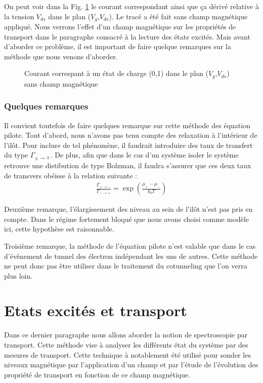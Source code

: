 On peut voir dans la Fig. \ref{SimulatedCoulombMap} le courant correspondant ainsi que ça dérivé relative à la tension $V_{ds}$ dans le plan ($V_g$,$V_{ds}$). Le tracé a été fait sans champ magnétique appliqué. Nous verrons l'effet d'un champ magnétique sur les propriétés de transport dans le paragraphe consacré à la lecture des états excités. Mais avant d'aborder ce problème, il est important de faire quelque remarques sur la méthode que nous venons d'aborder.
\begin{figure}
\caption{Courant correspant à un état de charge (0,1) dans le plan ($V_g$,$V_{ds}$) sans champ magnétique}
\label{SimulatedCoulombMap}
\end{figure}


\subsubsection{Quelques remarques}
Il convient toutefois de faire quelques remarque sur cette méthode des équation pilote. Tout d'abord, nous n'avons pas tenu compte des relaxation à l'intérieur de l'il\^ot. Pour inclure de tel phénomène, il faudrait introduire des taux de transfert du type $\Gamma_{\pm \rightarrow \mp}$. De plus, afin que dans le cas d'un système isoler le système retrouve une distibution de type Bolzman, il faudra s'assurer que ces deux taux de transvers obéisse à la relation suivante :
\begin{eqnarray}
\frac{\Gamma_{+ \rightarrow -}}{\Gamma_{- \rightarrow +}} = \exp(\frac{\mu_{+}- \mu_{-}}{k_bT}) \nonumber
\end{eqnarray}

Deuxième remarque, l'élargissement des niveau au sein de l'il\^ot n'est pas pris en compte. Dans le régime fortement bloqué que nous avons choisi comme modèle ici, cette hypothèse est raisonnable. 

Troisième remarque, la méthode de l'équation pilote n'est valable que dans le cas d'évènement de tunnel des électron indépendant les uns de autres. Cette méthode ne peut donc pas \^etre utiliser dans le traitement du cotunneling que l'on verra plus loin.

\section{Etats excités et transport}
Dans ce dernier paragraphe nous allons aborder la notion de spectroscopie par transport. Cette méthode vise à analyser les différents état du système par des mesures de transport. Cette technique à notablement été utilisé pour sonder les niveaux magnétique par l'application d'un champ et par l'étude de l'évolution des propriété de transport en fonction de ce champ magnétique.

